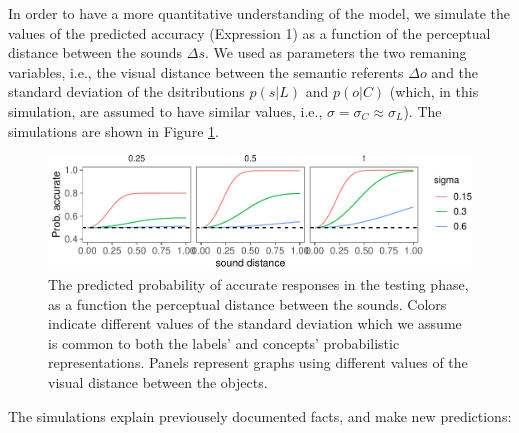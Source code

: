 \documentclass[10pt, letterpaper]{article}
\newenvironment{CodeChunk}{}{}
\begin{document}
In order to have a more quantitative understanding of the model, we
simulate the values of the predicted accuracy (Expression 1) as a
function of the perceptual distance between the sounds \(\Delta s\). We
used as parameters the two remaning variables, i.e., the visual distance
between the semantic referents \(\Delta o\) and the standard deviation
of the dsitributions \(p(s| L)\) and \(p(o | C)\) (which, in this
simulation, are assumed to have similar values, i.e.,
\(\sigma =\sigma_C \approx \sigma_L\)). The simulations are shown in
Figure \ref{fig:simulation}.

\begin{CodeChunk}
\begin{figure}[h]

{\centering \includegraphics{figs/simulation-1} 

}

\caption{\label{fig:simulation}The predicted probability of accurate responses in the testing phase, as a function the perceptual distance between the sounds. Colors indicate different values of the standard deviation which we assume is common to both the labels' and concepts' probabilistic representations. Panels represent graphs using different values of the visual distance between the objects.}\label{fig:simulation}
\end{figure}
\end{CodeChunk}

The simulations explain previousely documented facts, and make new
predictions:
\end{document}
